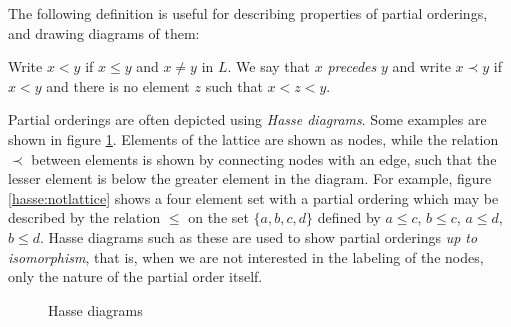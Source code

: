 The following definition is useful for describing properties of partial orderings, and drawing diagrams of them:
\begin{defn}
    Write $x < y$ if $x \le y$ and $x \neq y$ in $L$. We say that $x$ 
    \emph{precedes} $y$ and write $x \prec y$ if $x < y$ and there is no 
    element $z$ such that $x < z < y$.
\end{defn}

Partial orderings are often depicted using \emph{Hasse diagrams}. Some examples are shown in figure \ref{hasse}. Elements of the lattice are shown as nodes, while the relation $\prec$ between elements is shown by connecting nodes with an edge, such that the lesser element is below the greater element in the diagram. For example, figure \ref{hasse:notlattice} shows a four element set with a partial ordering which may be described by the relation $\le$ on the set $\{a,b,c,d\}$ defined by $a \le c$, $b \le c$, $a \le d$, $b\le d$. Hasse diagrams such as these are used to show partial orderings \emph{up to isomorphism}, that is, when we are not interested in the labeling of the nodes, only the nature of the partial order itself. 
\begin{figure}
\begin{center}

%
\hfill
{}
\hfill
{}
\hfill
\caption{Hasse diagrams}
\label{hasse}
\end{center}
\end{figure}

